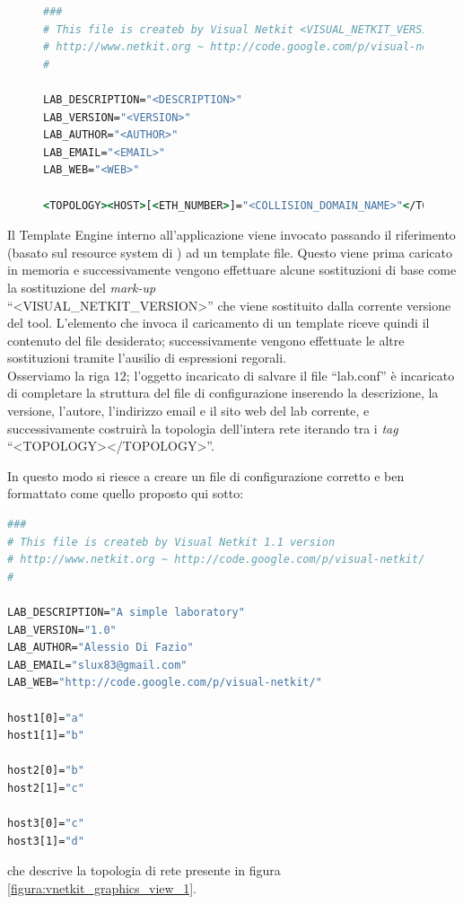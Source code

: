 \begin{figure}[!htb]
\begin{lstlisting}[language=csh]
###
# This file is createb by Visual Netkit <VISUAL_NETKIT_VERSION> version
# http://www.netkit.org ~ http://code.google.com/p/visual-netkit/
#

LAB_DESCRIPTION="<DESCRIPTION>"
LAB_VERSION="<VERSION>"
LAB_AUTHOR="<AUTHOR>"
LAB_EMAIL="<EMAIL>"
LAB_WEB="<WEB>"

<TOPOLOGY><HOST>[<ETH_NUMBER>]="<COLLISION_DOMAIN_NAME>"</TOPOLOGY>
\end{lstlisting}
\end{figure}
Il Template Engine interno all'applicazione viene invocato passando il riferimento (basato sul resource system di \qt{}) ad un template file. Questo viene prima caricato in memoria e successivamente vengono effettuare alcune sostituzioni di base come la sostituzione del \emph{mark-up}\\
``<VISUAL\_{}NETKIT\_{}VERSION>'' che viene sostituito dalla corrente versione del tool.
L'elemento che invoca il caricamento di un template riceve quindi il contenuto del file desiderato; successivamente vengono effettuate le altre sostituzioni tramite l'ausilio di espressioni regorali.\\
Osserviamo la riga $12$; l'oggetto incaricato di salvare il file ``lab.conf'' è incaricato di completare la struttura del file di configurazione inserendo la descrizione, la versione, l'autore, l'indirizzo email e il sito web del lab corrente, e successivamente costruirà la topologia dell'intera rete iterando tra i \emph{tag} ``<TOPOLOGY></TOPOLOGY>''.

In questo modo si riesce a creare un file di configurazione corretto e ben formattato come quello proposto qui sotto:
\begin{lstlisting}[language=csh]
###
# This file is createb by Visual Netkit 1.1 version
# http://www.netkit.org ~ http://code.google.com/p/visual-netkit/
#

LAB_DESCRIPTION="A simple laboratory"
LAB_VERSION="1.0"
LAB_AUTHOR="Alessio Di Fazio"
LAB_EMAIL="slux83@gmail.com"
LAB_WEB="http://code.google.com/p/visual-netkit/"

host1[0]="a"
host1[1]="b"

host2[0]="b"
host2[1]="c"

host3[0]="c"
host3[1]="d"
\end{lstlisting}
che descrive la topologia di rete presente in figura \ref{figura:vnetkit_graphics_view_1}.

